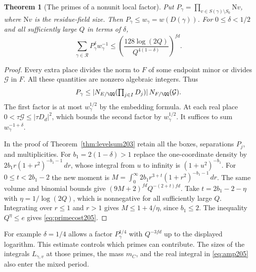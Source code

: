 \documentclass[a4paper,11pt]{article}
\newtheorem{theorem}[proposition]{Theorem}
\theoremstyle{definition}
\theoremstyle{remark}
\numberwithin{equation}{section}
\begin{document}
\begin{theorem}[The primes of a nonunit local factor]\label{thm:primecost205}
Put \(P_\gamma=\prod_{v\in S(\gamma)\setminus S_0}\mathrm N v\),
where \(\mathrm N v\) is the residue-field size. Then
\(P_\gamma\le w_\gamma=w(D(\gamma))\). For \(0\le\delta<1/2\)
and all sufficiently large \(Q\) in terms of \(\delta\),
\begin{equation}
   \sum_{\gamma\in\mathcal R} P_\gamma^\delta w_\gamma^{-1}
      \le\left(\frac{128\log(2Q)}
                         {Q^{4(1-\delta)}}\right)^{fd}.
                                                      \label{eq:primecost205}
\end{equation}
\end{theorem}
\begin{proof}
Every extra place divides the norm to \(F\) of some endpoint
minor or divides \(\mathcal G\) in \(F\). All these quantities
are nonzero algebraic integers. Thus
\[
 P_\gamma\le
 |N_{E/\QQ}(\textstyle\prod_{j\in I}D_j)|\,N_{F/\QQ}(\mathcal G).
\]
The first factor is at most \(w_\gamma^{1/2}\) by the embedding
formula. At each real place \(0<\tau\mathcal G\le|\tau D_d|^2\),
which bounds the second factor by \(w_\gamma^{1/2}\).
It suffices to sum \(w_\gamma^{-1+\delta}\).

In the proof of Theorem~\ref{thm:levelsum203} retain all the boxes,
separations \(P_j\), and multiplicities. For \(b_1=2(1-\delta)>1\)
replace the one-coordinate density by
\(2b_1 r(1+r^2)^{-b_1-1}\,dr\), whose integral from \(u\) to
infinity is \((1+u^2)^{-b_1}\). For \(0\le t<2b_1-2\) the new
moment is \(M=\int_0^\infty 2b_1 r^{3+t}(1+r^2)^{-b_1-1}\,dr\).
The same volume and binomial bounds give
\((9M+2)^{fd}Q^{-(2+t)fd}\). Take
\(t=2b_1-2-\eta\) with \(\eta=1/\log(2Q)\), which is nonnegative
for all sufficiently large \(Q\). Integrating over \(r\le1\) and
\(r>1\) gives \(M\le1+4/\eta\), since \(b_1\le2\).
The inequality \(Q^\eta\le e\) gives \eqref{eq:primecost205}.
\end{proof}

For example \(\delta=1/4\) allows a factor \(P_\gamma^{1/4}\)
with \(Q^{-3fd}\) up to the displayed logarithm. This estimate
controls which primes can contribute. The sizes of the integrals
\(L_{\gamma,v}\) at those primes, the mass \(m_C\), and the real
integral in \eqref{eq:amp205} also enter the mixed period.
\end{document}
